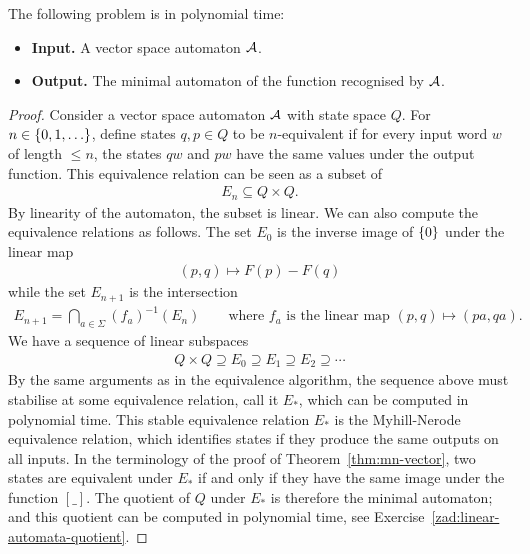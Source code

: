 \begin{theorem}
The following problem is in polynomial time:
	\begin{itemize}
		\item {\bf Input.} A  vector space automaton $\mathcal{A}$.
		\item {\bf Output.} The minimal automaton of the function recognised  by $\mathcal{A}$.
	\end{itemize}
\end{theorem}
\begin{proof}
	 Consider a vector space automaton $\mathcal{A}$ with state space $Q$. For  $n \in \{0,1,\ldots\}$,  define states $q,p \in Q$ to be $n$-equivalent if for every input word $w$ of length $\le n$, the  states $
  qw$ and $pw$ have the same values under the output function. 
    This equivalence relation can be seen as a subset of 
 \begin{align*}
  E_n \subseteq Q \times Q.
\end{align*}
 By linearity of the automaton, the subset is linear.  We can also compute the equivalence relations as follows.
  The set $E_0$ is the inverse image of $\{0\}$ under the linear map
  \begin{align*}
(p,q) \mapsto F(p) - F(q)
\end{align*}
 while the set $E_{n+1}$ is the intersection
  \begin{align*}
E_{n+1} = \bigcap_{a \in \Sigma} 	(f_a)^{-1} (E_n) \qquad \text{where $f_a$ is the linear map $(p,q) \mapsto (pa,qa)$}.
\end{align*}
We have a sequence of linear subspaces
 \begin{align*}
  Q \times Q \supseteq E_0 \supseteq E_1 \supseteq E_2 \supseteq \cdots
\end{align*}
By the same arguments as in the equivalence algorithm,  the sequence above must stabilise at some equivalence relation, call it  $E_*$, which can be computed in polynomial time. This stable equivalence relation $E_*$ is the  Myhill-Nerode equivalence relation, which identifies states  if they produce the same outputs on all inputs. In the terminology of the proof of Theorem~\ref{thm:mn-vector}, two states are equivalent under $E_*$ if and only if  they have the same image under the function $[\_]$.  The quotient of $Q$ under $E_*$ is therefore the  minimal automaton; and this quotient can be computed in polynomial time, see Exercise~\ref{zad:linear-automata-quotient}.
\end{proof}

